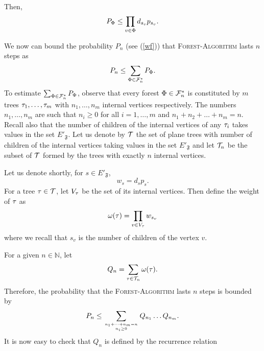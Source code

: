\documentclass[11pt]{article}
\let\\=\noindent
\def\ee{\end{equation}}
\def\be{\begin{equation}}
\let\\=\noindent
\def\ee{\end{equation}}
\def\be{\begin{equation}}
\def\FF{{\mathfrak{F}}}
\begin{document}
\\Then,
\begin{equation}
P_\Phi \leq \prod_{v\in \Phi}d_{s_v}p_{s_v}.
\end{equation}

\\We now can bound  the probability $P_n$ (see (\ref{wf})) that \textsc{Forest-Algorithm} lasts $n$ steps as
$$
P_n\le  \sum_{\Phi\in {\cal F}^*_n}{P_\Phi}.
$$
\\To estimate  $\sum_{\Phi\in {\cal F}^*_n}{P_\Phi}$, observe that every forest $\Phi\in {\cal F}^*_n$ is constituted by $m$ trees $\tau_1,\dots,\tau_m$
with $n_1,\dots, n_m$ internal vertices respectively. The numbers $n_1, \dots,n_m$ are such that $n_i\ge 0$ for all $i=1,\dots, m$ and $n_1+n_2+\dots+n_m=n$.
Recall also  that the number of children of the internal vertices  of any  $\tau_i$ takes values in the set $E'_\FF$.
Let us denote by $\cal T$ the set of plane trees with number of children of the internal vertices taking  values in the set $E'_\FF$ and let ${\cal T}_n$ be the subset of  $\cal T$ formed by the trees with exactly $n$ internal vertices.

\\Let us denote  shortly,  for $s \in E'_\FF$,
\be\label{wk}
w_s= d_{s}p_{s}.
\ee
For  a tree $\tau\in \cal T$, let $V_{\tau}$ be the set of its internal vertices. Then  define the weight of $\tau$ as
$$
\omega(\tau)= \prod_{v\in V_\tau}w_{s_v}
$$
where we recall that $s_v$ is the number of children of the vertex $v$.  

\\For a given $n\in \mathbb{N}$, let
$$
Q_n=\sum_{\tau\in {\cal T}_n}\omega(\tau).
$$
Therefore, the probability that the \textsc{Forest-Algorithm} lasts $n$ steps is bounded by
\be\label{penne}
P_n\le  \sum_{n_1+\dots +n_m=n\atop n_i\ge 0}Q_{n_1}\dots Q_{n_m}.
\ee
It is now easy to check that  $Q_n$ is defined by the recurrence relation
\end{document}
